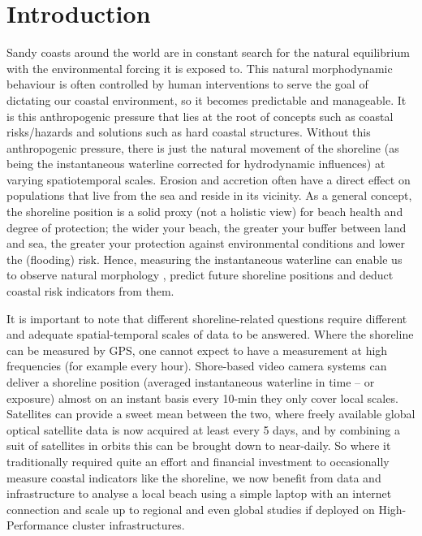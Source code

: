 \documentclass[remotesensing,article,submit,pdftex,moreauthors]{Definitions/mdpi}
\begin{document}
\section{Introduction}
Sandy coasts around the world are in constant search for the natural equilibrium with the environmental forcing it is exposed to. This natural morphodynamic behaviour is often controlled by human interventions to serve the goal of dictating our coastal environment, so it becomes predictable and manageable. It is this anthropogenic pressure that lies at the root of concepts such as coastal risks/hazards and solutions such as hard coastal structures. Without this anthropogenic pressure, there is just the natural movement of the shoreline (as being the instantaneous waterline corrected for hydrodynamic influences) at varying spatiotemporal scales. Erosion and accretion often have a direct effect on populations that live from the sea and reside in its vicinity. As a general concept, the shoreline position is a solid proxy (not a holistic view) for beach health and degree of protection; the wider your beach, the greater your buffer between land and sea, the greater your protection against environmental conditions and lower the (flooding) risk. Hence, measuring the instantaneous waterline can enable us to observe natural morphology \citep{Vitousek:17}, predict future shoreline positions \citep{vitousek:23} and deduct coastal risk indicators from them.

It is important to note that different shoreline-related questions require different and adequate spatial-temporal scales of data to be answered. Where the shoreline can be measured by GPS, one cannot expect to have a measurement at high frequencies (for example every hour). Shore-based video camera systems can deliver a shoreline position (averaged instantaneous waterline in time -- or exposure) almost on an instant basis every 10-min they only cover local scales. Satellites can provide a sweet mean between the two, where freely available global optical satellite data is now acquired at least every 5 days, and by combining a suit of satellites in orbits this can be brought down to near-daily. So where it traditionally required quite an effort and financial investment to occasionally measure coastal indicators like the shoreline, we now benefit from data and infrastructure to analyse a local beach using a simple laptop with an internet connection and scale up to regional and even global studies if deployed on High-Performance cluster infrastructures. 
\end{document}
